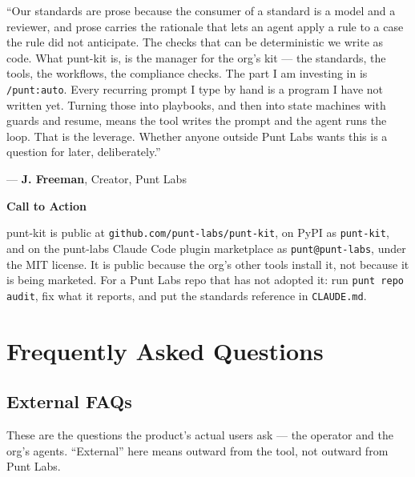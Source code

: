 \documentclass[11pt,letterpaper]{article}
\newcommand{\prsection}[1]{%
  \vspace{1em}%
  {\large\bfseries\color{SectionBlue}#1}%
  \vspace{0.3em}\par%
}
\begin{document}
\begin{spokespersonquote}
``Our standards are prose because the consumer of a standard is a model and a
reviewer, and prose carries the rationale that lets an agent apply a rule to a
case the rule did not anticipate. The checks that can be deterministic we
write as code. What punt-kit is, is the manager for the org's kit --- the
standards, the tools, the workflows, the compliance checks. The part I am
investing in is \texttt{/punt:auto}. Every
recurring prompt I type by hand is a program I have not written yet. Turning
those into playbooks, and then into state machines with guards and resume,
means the tool writes the prompt and the agent runs the loop. That is the
leverage. Whether anyone outside Punt Labs wants this is a question for later,
deliberately.''

\raggedleft --- \textbf{J. Freeman}, Creator, Punt Labs
\end{spokespersonquote}

\prsection{Call to Action}

punt-kit is public at {\small\texttt{github.com/punt-labs/punt-kit}}, on PyPI
as \texttt{punt-kit}, and on the punt-labs Claude Code plugin marketplace as
\texttt{punt@punt-labs}, under the MIT license. It is public because the org's
other tools install it, not because it is being marketed. For a Punt Labs repo
that has not adopted it: run \texttt{punt repo audit}, fix what it reports, and put
the standards reference in \texttt{CLAUDE.md}.

\newpage


\section*{Frequently Asked Questions}


\subsection*{External FAQs}

These are the questions the product's actual users ask --- the operator and the
org's agents. ``External'' here means outward from the tool, not outward from
Punt Labs.
\end{document}
